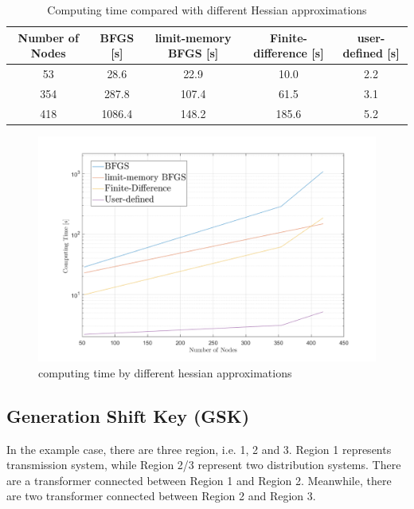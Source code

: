 \documentclass{article}
\begin{document}
\begin{table}[hbt!]
\centering
 \begin{tabular}{||c c c c c||}
 Number of Nodes & BFGS [s] & limit-memory BFGS [s] & Finite-difference [s] & user-defined [s]\\ [0.5ex] 
 \hline\hline
 53 & 28.6 & 22.9 & 10.0 & 2.2\\ 
 \hline
 354  & 287.8 & 107.4 & 61.5 & 3.1\\
 \hline
 418  & 1086.4 & 148.2 & 185.6 & 5.2\\  [1ex] 
\end{tabular}
\caption{Computing time compared with different Hessian approximations}
\label{table: Computing time compared with different Hessian approximations}
\end{table}
\begin{figure}[hbt!]
 \begin{center}
    \includegraphics[width=1\textwidth]{Simulation_Results/computing_time_diff_hessian.pdf}
    \caption{computing time by different hessian approximations}
    \label{fig:computing time by different hessian approximations}
 \end{center}
\end{figure}

\newpage
\subsection{Generation Shift Key (GSK)}

In the example case, there are three region, i.e. 1, 2 and 3. Region 1 represents transmission system, while Region 2/3 represent two distribution systems. There are a transformer connected between Region 1 and Region 2. Meanwhile, there are two transformer connected between Region 2 and Region 3. \\
\end{document}
